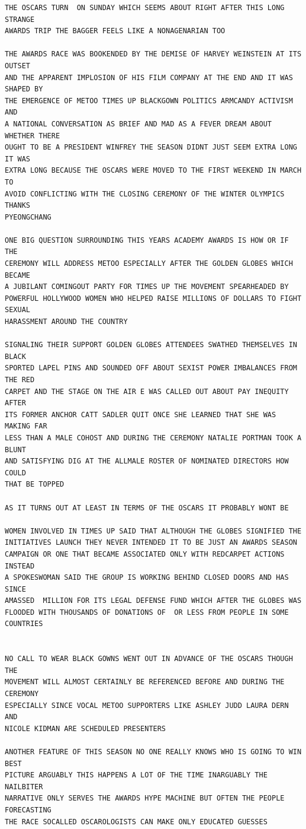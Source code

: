 \documentclass[12pt]{article}
\begin{document}
\begin{verbatim}
THE OSCARS TURN  ON SUNDAY WHICH SEEMS ABOUT RIGHT AFTER THIS LONG STRANGE
AWARDS TRIP THE BAGGER FEELS LIKE A NONAGENARIAN TOO

THE AWARDS RACE WAS BOOKENDED BY THE DEMISE OF HARVEY WEINSTEIN AT ITS OUTSET
AND THE APPARENT IMPLOSION OF HIS FILM COMPANY AT THE END AND IT WAS SHAPED BY
THE EMERGENCE OF METOO TIMES UP BLACKGOWN POLITICS ARMCANDY ACTIVISM AND
A NATIONAL CONVERSATION AS BRIEF AND MAD AS A FEVER DREAM ABOUT WHETHER THERE
OUGHT TO BE A PRESIDENT WINFREY THE SEASON DIDNT JUST SEEM EXTRA LONG IT WAS
EXTRA LONG BECAUSE THE OSCARS WERE MOVED TO THE FIRST WEEKEND IN MARCH TO
AVOID CONFLICTING WITH THE CLOSING CEREMONY OF THE WINTER OLYMPICS THANKS
PYEONGCHANG

ONE BIG QUESTION SURROUNDING THIS YEARS ACADEMY AWARDS IS HOW OR IF THE
CEREMONY WILL ADDRESS METOO ESPECIALLY AFTER THE GOLDEN GLOBES WHICH BECAME
A JUBILANT COMINGOUT PARTY FOR TIMES UP THE MOVEMENT SPEARHEADED BY 
POWERFUL HOLLYWOOD WOMEN WHO HELPED RAISE MILLIONS OF DOLLARS TO FIGHT SEXUAL
HARASSMENT AROUND THE COUNTRY

SIGNALING THEIR SUPPORT GOLDEN GLOBES ATTENDEES SWATHED THEMSELVES IN BLACK
SPORTED LAPEL PINS AND SOUNDED OFF ABOUT SEXIST POWER IMBALANCES FROM THE RED
CARPET AND THE STAGE ON THE AIR E WAS CALLED OUT ABOUT PAY INEQUITY AFTER
ITS FORMER ANCHOR CATT SADLER QUIT ONCE SHE LEARNED THAT SHE WAS MAKING FAR
LESS THAN A MALE COHOST AND DURING THE CEREMONY NATALIE PORTMAN TOOK A BLUNT
AND SATISFYING DIG AT THE ALLMALE ROSTER OF NOMINATED DIRECTORS HOW COULD
THAT BE TOPPED

AS IT TURNS OUT AT LEAST IN TERMS OF THE OSCARS IT PROBABLY WONT BE

WOMEN INVOLVED IN TIMES UP SAID THAT ALTHOUGH THE GLOBES SIGNIFIED THE
INITIATIVES LAUNCH THEY NEVER INTENDED IT TO BE JUST AN AWARDS SEASON
CAMPAIGN OR ONE THAT BECAME ASSOCIATED ONLY WITH REDCARPET ACTIONS INSTEAD
A SPOKESWOMAN SAID THE GROUP IS WORKING BEHIND CLOSED DOORS AND HAS SINCE
AMASSED  MILLION FOR ITS LEGAL DEFENSE FUND WHICH AFTER THE GLOBES WAS
FLOODED WITH THOUSANDS OF DONATIONS OF  OR LESS FROM PEOPLE IN SOME 
COUNTRIES


NO CALL TO WEAR BLACK GOWNS WENT OUT IN ADVANCE OF THE OSCARS THOUGH THE
MOVEMENT WILL ALMOST CERTAINLY BE REFERENCED BEFORE AND DURING THE CEREMONY 
ESPECIALLY SINCE VOCAL METOO SUPPORTERS LIKE ASHLEY JUDD LAURA DERN AND
NICOLE KIDMAN ARE SCHEDULED PRESENTERS

ANOTHER FEATURE OF THIS SEASON NO ONE REALLY KNOWS WHO IS GOING TO WIN BEST
PICTURE ARGUABLY THIS HAPPENS A LOT OF THE TIME INARGUABLY THE NAILBITER
NARRATIVE ONLY SERVES THE AWARDS HYPE MACHINE BUT OFTEN THE PEOPLE FORECASTING
THE RACE SOCALLED OSCAROLOGISTS CAN MAKE ONLY EDUCATED GUESSES


\end{verbatim}
\end{document}
